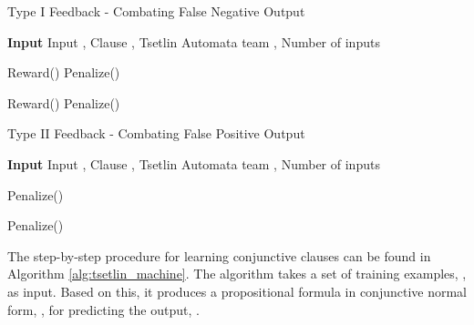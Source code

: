 \documentclass[11pt,a4paper]{article}
\newcommand{\Input}{{\hspace*{\algorithmicindent} \textbf{Input }}}
\begin{document}
\begin{algorithm}
\caption{Type I Feedback - Combating False Negative Output}
\label{alg:type_i_feedback}

\Input{Input , Clause , Tsetlin Automata team , Number of inputs }

\begin{algorithmic} [1]

\For{}
    \State 
        \State Reward() 
        \State Penalize() 
    \EndIf
    
        \State Reward() 
        \State Penalize()  
    \EndIf
\EndFor

\EndProcedure
\end{algorithmic}
\end{algorithm}

\begin{algorithm}
\caption{Type II Feedback - Combating False Positive Output}
\label{alg:type_ii_feedback}

\Input{Input , Clause , Tsetlin Automata team , Number of inputs }

\begin{algorithmic} [1]

\For{}
    \State 
    
        \State Penalize() 
    \EndIf

        \State Penalize() 
    \EndIf
\EndFor

\EndProcedure
\end{algorithmic}
\end{algorithm}

The step-by-step procedure for learning conjunctive clauses can be found in Algorithm \ref{alg:tsetlin_machine}. The algorithm takes a set of training examples, , as input. Based on this, it produces a propositional formula in conjunctive normal form, , for predicting the output, . 
\end{document}
